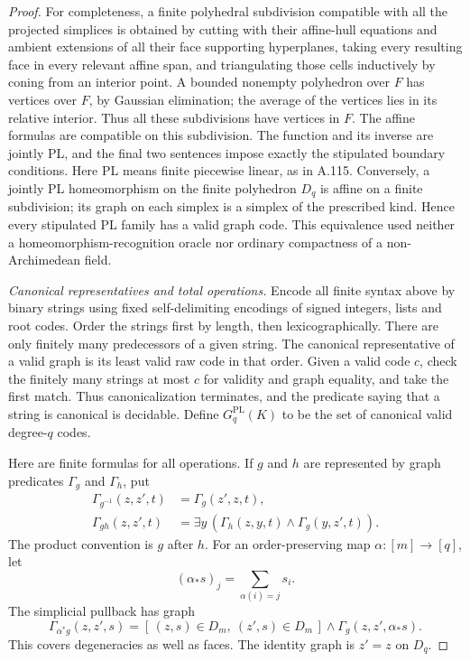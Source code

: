 \begin{proof}
For completeness, a finite polyhedral subdivision compatible with
all the projected simplices is obtained by cutting with their affine-hull equations and ambient
extensions of all their face supporting hyperplanes, taking every
resulting face in every relevant affine span, and
triangulating those cells inductively by coning from an interior
point. A bounded nonempty polyhedron over $F$ has vertices over $F$,
by Gaussian elimination; the average of the vertices lies in its
relative interior. Thus all these subdivisions have vertices in $F$.
The affine formulas are compatible on this subdivision. The function
and its inverse are jointly PL, and the final two sentences impose
exactly the stipulated boundary conditions. Here PL means finite piecewise linear, as in A.115. Conversely, a jointly PL
homeomorphism on the finite polyhedron $D_q$ is affine on a finite
subdivision; its graph on each simplex is a simplex of the prescribed
kind. Hence every stipulated PL family has a valid graph code.
This equivalence used neither a homeomorphism-recognition oracle nor
ordinary compactness of a non-Archimedean field.

\emph{Canonical representatives and total operations.}
Encode all finite syntax above by binary strings using fixed
self-delimiting encodings of signed integers, lists and root codes.
Order the strings first by length, then lexicographically. There
are only finitely many predecessors of a given string. The canonical
representative of a valid graph is its least valid raw code in that
order. Given a valid code $c$, check the finitely many strings at
most $c$ for validity and graph equality, and take the first match.
Thus canonicalization terminates, and the predicate saying that a
string is canonical is decidable. Define $G_q^{\mathrm{PL}}(K)$ to
be the set of canonical valid degree-$q$ codes.

Here are finite formulas for all operations. If $g$ and $h$ are
represented by graph predicates $\Gamma_g$ and $\Gamma_h$, put
\[
 \begin{split}
 \Gamma_{g^{-1}}(z,z',t)&=\Gamma_g(z',z,t),\\
 \Gamma_{gh}(z,z',t)&=\exists y\,
       (\Gamma_h(z,y,t)\wedge\Gamma_g(y,z',t)).
 \end{split}
                                                        \tag{A.131.5}
\]
The product convention is $g$ after $h$.
For an order-preserving map $\alpha:[m]\to[q]$, let
\[
 (\alpha_*s)_j=\sum_{\alpha(i)=j}s_i.
\]
The simplicial pullback has graph
\[
 \Gamma_{\alpha^*g}(z,z',s)=
     [\,(z,s)\in D_m,\ (z',s)\in D_m\,]
       \wedge\Gamma_g(z,z',\alpha_*s).
                                                        \tag{A.131.6}
\]
This covers degeneracies as well as faces. The identity graph is
$z'=z$ on $D_q$.


\end{proof}
